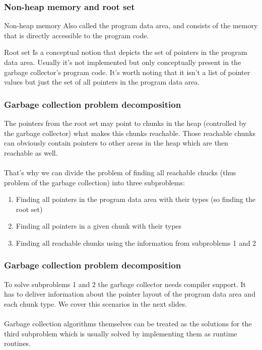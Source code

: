 \documentclass[presentation]{beamer}
\begin{document}
\begin{frame}
    \frametitle{Non-heap memory and root set}
    \begin{block}{Non-heap memory}
    \justifying
    Also called the program data area, and consists of the memory that is directly accessible to the program code.
    \end{block}
    
    \begin{block}{Root set}
    \justifying
    Is a conceptual notion that depicts the set of pointers in the program data area. Usually it's not implemented but only conceptually present in the garbage collector's program code. It's worth noting that it isn't a list of pointer values but just the set of all pointers in the program data area.
    \end{block}
\end{frame}

\begin{frame}
    \frametitle{Garbage collection problem decomposition}
    \justifying
    The pointers from the root set may point to chunks in the heap (controlled by the garbage collector) what makes this chunks reachable. Those reachable chunks can obviously contain pointers to other areas in the heap which are then reachable as well.
    \\~\\
    \justifying
    That's why we can divide the problem of finding all reachable chucks (thus problem of the garbage collection) into three subproblems:
    
    \begin{enumerate}
        \item Finding all pointers in the program data area with their types (so finding the root set)
        \item Finding all pointers in a given chunk with their types
        \item Finding all reachable chunks using the information from subproblems 1 and 2
    \end{enumerate}
\end{frame}

\begin{frame}
    \frametitle{Garbage collection problem decomposition}
    \justifying
    To solve subproblems 1 and 2 the garbage collector needs compiler support. It has to deliver information about the pointer layout of the program data area and each chunk type. We cover this 
    scenarios in the next slides.
    \\~\\
    Garbage collection algorithms themselves can be treated as the solutions for the third subproblem which is usually solved by implementing them as runtime routines.
\end{frame}
\end{document}
